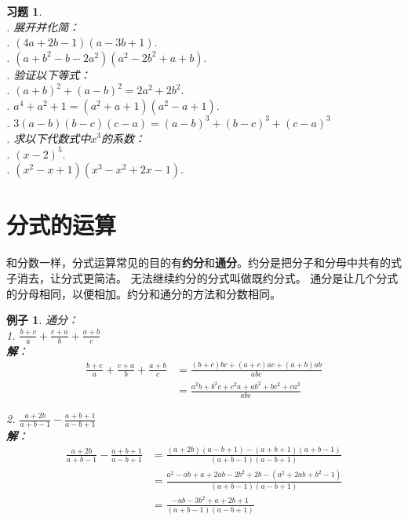 \documentclass[12pt,UTF8]{ctexbook}
\newtheorem{ex}{例子}[section]
\newtheorem{xt}{习题}[section]
\begin{document}
\begin{xt}\label{xt:5-0-0}
    \mbox{}\\
    . 展开并化简：\\
    . $(4a + 2b - 1)(a - 3b + 1).$\\  %
    . $(a + b^2 - b - 2a^2)(a^2 - 2b^2 + a + b).$\\  %
    . 验证以下等式：\\
    . $(a + b)^2 + (a - b)^2 = 2a^2+2b^2.$\\
    . $a^4 + a^2 + 1 = (a^2+a+1)(a^2-a+1).$\\
    . $3(a-b)(b-c)(c-a) = (a-b)^3+(b-c)^3+(c-a)^3$\\
    . 求以下代数式中$x^3$的系数：\\
    . $(x - 2)^5.$\\
    . $(x^2 - x + 1)(x^3 - x^2 +2x - 1).$
\end{xt}

\section{分式的运算}

和分数一样，分式运算常见的目的有\textbf{约分}和\textbf{通分}。约分是把分子和分母中共有的式子消去，让分式更简洁。
无法继续约分的分式叫做既约分式。
通分是让几个分式的分母相同，以便相加。约分和通分的方法和分数相同。

\begin{ex}\label{ex:5-1-0}
    通分：\\
    1. $\frac{b+c}{a} + \frac{c+a}{b} + \frac{a+b}{c}$\\
    \textbf{解}：
    \begin{align*}
        \frac{b+c}{a} + \frac{c+a}{b} + \frac{a+b}{c} &= \frac{(b+c)bc+(a+c)ac+(a+b)ab}{abc} \\
        &= \frac{ a^2b+b^2c+c^2a + ab^2+bc^2+ca^2}{abc} 
    \end{align*}

    2. $\frac{a+2b}{a+b-1} - \frac{a+b+1}{a-b+1}$\\
    \textbf{解}：
    \begin{align*}
        \frac{a+2b}{a+b-1} - \frac{a+b+1}{a-b+1} &= \frac{(a+2b)(a-b+1) - (a+b+1)(a+b-1)}{(a+b-1)(a-b+1)} \\
        &=  \frac{a^2-ab+a+2ab-2b^2+2b - (a^2+2ab+b^2-1)}{(a+b-1)(a-b+1)}  \\
        &= \frac{-ab-3b^2+a+2b+1}{(a+b-1)(a-b+1)} 
    \end{align*}
\end{ex}
\end{document}
